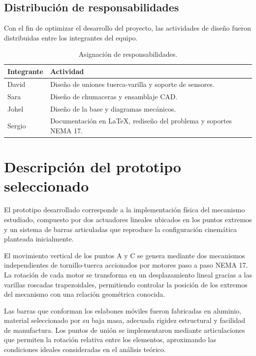 \subsection{Distribución de responsabilidades}

Con el fin de optimizar el desarrollo del proyecto, las actividades de diseño fueron distribuidas entre los integrantes del equipo.

\begin{table}[H]
\centering
\caption{Asignación de responsabilidades.}
\begin{tabularx}{\columnwidth}{|l|X|}
\hline
\rowcolor{gray!20}
Integrante & Actividad\\
\hline
David &
Diseño de uniones tuerca-varilla y soporte de sensores.\\
\hline
Sara &
Diseño de chumaceras y ensamblaje CAD.\\
\hline
Johel &
Diseño de la base y diagramas mecánicos.\\
\hline
Sergio &
Documentación en \LaTeX, rediseño del problema y soportes NEMA 17.\\
\hline
\end{tabularx}
\end{table}

\section{Descripción del prototipo seleccionado}

El prototipo desarrollado corresponde a la implementación física del mecanismo estudiado, compuesto por dos actuadores lineales ubicados en los puntos extremos y un sistema de barras articuladas que reproduce la configuración cinemática planteada inicialmente.



El movimiento vertical de los puntos A y C se genera mediante dos mecanismos independientes de tornillo-tuerca accionados por motores paso a paso NEMA 17. La rotación de cada motor se transforma en un desplazamiento lineal gracias a las varillas roscadas trapezoidales, permitiendo controlar la posición de los extremos del mecanismo con una relación geométrica conocida.

Las barras que conforman los eslabones móviles fueron fabricadas en aluminio, material seleccionado por su baja masa, adecuada rigidez estructural y facilidad de manufactura. Los puntos de unión se implementaron mediante articulaciones que permiten la rotación relativa entre los elementos, aproximando las condiciones ideales consideradas en el análisis teórico.

